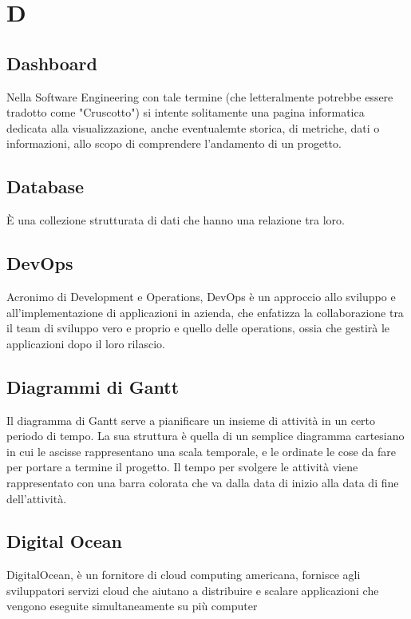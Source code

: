 \section*{D}

\subsection{Dashboard}
Nella Software Engineering con tale termine (che letteralmente potrebbe essere tradotto come "Cruscotto") si intente solitamente una pagina  informatica dedicata alla visualizzazione, anche eventualemte storica, di metriche, dati o informazioni, allo scopo di comprendere l'andamento di un progetto.

\subsection{Database}
È una collezione strutturata di dati che hanno una relazione tra loro.

\subsection{DevOps}
Acronimo di Development e Operations, DevOps è un approccio allo sviluppo e all’implementazione di applicazioni in azienda, che enfatizza la collaborazione tra il team di sviluppo vero e proprio e quello delle operations, ossia che gestirà le applicazioni dopo il loro rilascio.

\subsection{Diagrammi di Gantt}
Il diagramma di Gantt serve a pianificare un insieme di attività in un certo periodo di tempo. La sua struttura è quella di un semplice diagramma cartesiano in cui le ascisse rappresentano una scala temporale, e le ordinate le cose da fare per portare a termine il progetto. Il tempo per svolgere le attività viene rappresentato con una barra colorata che va dalla data di inizio alla data di fine dell'attività.

\subsection{Digital Ocean}
DigitalOcean, è un fornitore di cloud computing americana, fornisce agli sviluppatori servizi cloud che aiutano a distribuire e scalare applicazioni che vengono eseguite simultaneamente su più computer

